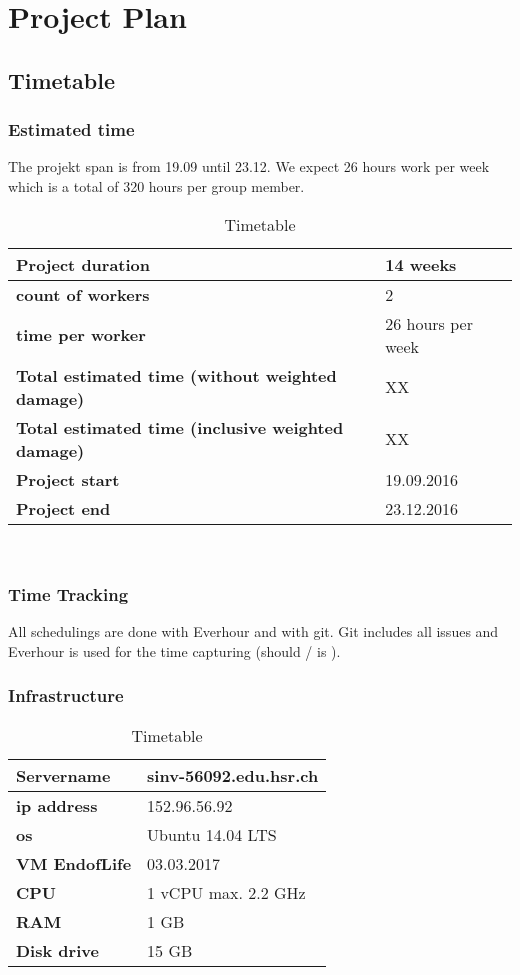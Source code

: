 \chapter{Project Plan}
\section{Timetable}
\subsection{Estimated time}
The projekt span is from 19.09 until 23.12. We expect 26 hours work per week which is a total of
320 hours per group member.

\begin{table}[H]
  \centering
  \scriptsize
  \caption{Timetable}
  \begin{tabular}{|p{80mm}|p{15mm}|}
    \hline 	\bf Project duration & 14 weeks \\ \hline
	\bf count of workers & 2 \\ \hline
	\bf time per worker & 26 hours per week \\ \hline
	\bf Total estimated time (without weighted damage) & XX \\ \hline
	\bf Total estimated time (inclusive weighted damage) & XX \\ \hline
	\bf Project start & 19.09.2016 \\ \hline
	\bf Project end & 23.12.2016 \\ \hline
  \end{tabular} \\
\end{table}

\subsection{Time Tracking}
All schedulings are done with Everhour and with git. Git includes all issues and Everhour is used for the time capturing (should / is ).

\subsection{Infrastructure}
\begin{table}[H]
  \centering
  \scriptsize
  \caption{Timetable}
  \begin{tabular}{|p{25mm}|p{30mm}|}
    \hline 	\bf Servername & sinv-56092.edu.hsr.ch \\ \hline
	\bf ip address & 152.96.56.92 \\ \hline
	\bf os & Ubuntu 14.04 LTS \\ \hline
	\bf VM EndofLife & 03.03.2017 \\ \hline
	\bf CPU & 1 vCPU max. 2.2 GHz \\ \hline
	\bf RAM & 1 GB \\ \hline
	\bf Disk drive & 15 GB \\ \hline
  \end{tabular} \\
\end{table}

